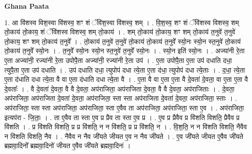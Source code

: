 \documentclass[17pt]{extarticle}
\begin{document}
\textbf{Ghana Paata } \newline

1. आ वि॑शस्व विश॒स्वा वि॑शस्व॒ शꣳ शं ॅवि॑श॒स्वा वि॑शस्व॒ शम् । . वि॒श॒स्व॒ शꣳ शं ॅवि॑शस्व विशस्व॒ शम् तो॒काय॑ तो॒काय॒ शं ॅवि॑शस्व विशस्व॒ शम् तो॒काय॑ । . शम् तो॒काय॑ तो॒काय॒ शꣳ शम् तो॒काय॑ त॒नुवे॑ त॒नुवे॑ तो॒काय॒ शꣳ शम् तो॒काय॑ त॒नुवे᳚ । . तो॒काय॑ त॒नुवे॑ त॒नुवे॑ तो॒काय॑ तो॒काय॑ त॒नुवे᳚ स्यो॒नः स्यो॒न स्त॒नुवे॑ तो॒काय॑ तो॒काय॑ त॒नुवे᳚ स्यो॒नः । . त॒नुवे᳚ स्यो॒नः स्यो॒न स्त॒नुवे॑ त॒नुवे᳚ स्यो॒नः । . स्यो॒न इति॑ स्यो॒नः । . अज्या॑नी रे॒ता ए॒ता अज्या॑नी॒ रज्या॑नी रे॒ता उपोपै॒ता अज्या॑नी॒ रज्या॑नी रे॒ता उप॑ । . ए॒ता उपोपै॒ता ए॒ता उप॑ दधाति दधा॒ त्युपै॒ता ए॒ता उप॑ दधाति । . उप॑ दधाति दधा॒ त्युपोप॑ दधा त्ये॒ता ए॒ता द॑धा॒ त्युपोप॑ दधा त्ये॒ताः । . द॒धा॒ त्ये॒ता ए॒ता द॑धाति दधा त्ये॒ता वै वा ए॒ता द॑धाति दधा त्ये॒ता वै । . ए॒ता वै वा ए॒ता ए॒ता वै दे॒वता॑ दे॒वता॒ वा ए॒ता ए॒ता वै दे॒वताः᳚ । . वै दे॒वता॑ दे॒वता॒ वै वै दे॒वता॒ अप॑राजिता॒ अप॑राजिता दे॒वता॒ वै वै दे॒वता॒ अप॑राजिताः । . दे॒वता॒ अप॑राजिता॒ अप॑राजिता दे॒वता॑ दे॒वता॒ अप॑राजिता॒ स्ता स्ता अप॑राजिता दे॒वता॑ दे॒वता॒ अप॑राजिता॒ स्ताः । . अप॑राजिता॒ स्ता स्ता अप॑राजिता॒ अप॑राजिता॒ स्ता ए॒वैव ता अप॑राजिता॒ अप॑राजिता॒ स्ता ए॒व । . अप॑राजिता॒ इत्यप॑रा - जि॒ताः॒ । . ता ए॒वैव ता स्ता ए॒व प्र प्रैव ता स्ता ए॒व प्र । . ए॒व प्र प्रैवैव प्र वि॑शति विशति॒ प्रैवैव प्र वि॑शति । . प्र वि॑शति विशति॒ प्र प्र वि॑शति॒ न न वि॑शति॒ प्र प्र वि॑शति॒ न । . वि॒श॒ति॒ न न वि॑शति विशति॒ नैवैव न वि॑शति विशति॒ नैव । . नैवैव न नैव जी॑यते जीयत ए॒व न नैव जी॑यते । . ए॒व जी॑यते जीयत ए॒वैव जी॑यते ब्रह्मवा॒दिनो᳚ ब्रह्मवा॒दिनो॑ जीयत ए॒वैव जी॑यते ब्रह्मवा॒दिनः॑ । \newline
\end{document}
